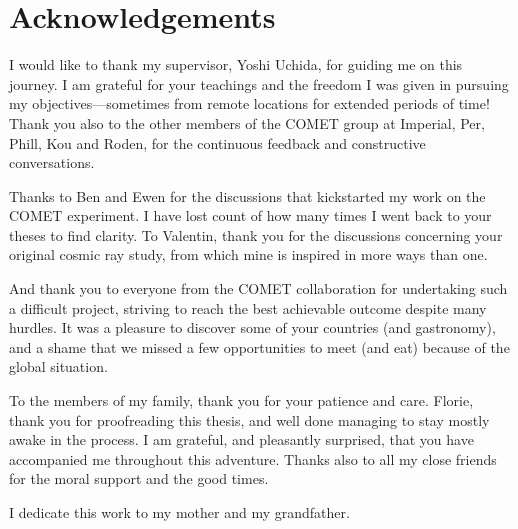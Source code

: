 \chapter*{Acknowledgements}

I would like to thank my supervisor, Yoshi Uchida, for guiding me on this
journey. I am grateful for your teachings and the freedom I was given in
pursuing my objectives---sometimes from remote locations for extended periods of
time! Thank you also to the other members of the COMET group at Imperial, Per,
Phill, Kou and Roden, for the continuous feedback and constructive
conversations. 

Thanks to Ben and Ewen for the discussions that kickstarted my work on the COMET
experiment. I have lost count of how many times I went back to your theses to
find clarity.
To Valentin, thank you for the discussions concerning your original cosmic ray
study, from which mine is inspired in more ways than one.

And thank you to everyone from the COMET collaboration for undertaking such a
difficult project, striving to reach the best achievable outcome despite many
hurdles. It was a pleasure to discover some of your countries (and gastronomy),
and a shame that we missed a few opportunities to meet (and eat) because of the
global situation.


To the members of my family, thank you for your patience and care. Florie, thank
you for proofreading this thesis, and well done managing to stay mostly awake in
the process. I am grateful, and pleasantly surprised, that you have accompanied
me throughout this adventure. Thanks also to all my close friends for the moral
support and the good times.

I dedicate this work to my mother and my grandfather.

